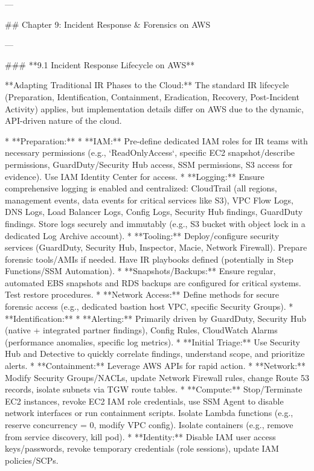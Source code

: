 \documentclass{article}
\begin{document}
---

## Chapter 9: Incident Response & Forensics on AWS

---

### **9.1 Incident Response Lifecycle on AWS**

**Adapting Traditional IR Phases to the Cloud:** The standard IR lifecycle (Preparation, Identification, Containment, Eradication, Recovery, Post-Incident Activity) applies, but implementation details differ on AWS due to the dynamic, API-driven nature of the cloud.

* **Preparation:**
    * **IAM:** Pre-define dedicated IAM roles for IR teams with necessary permissions (e.g., `ReadOnlyAccess`, specific EC2 snapshot/describe permissions, GuardDuty/Security Hub access, SSM permissions, S3 access for evidence). Use IAM Identity Center for access.
    * **Logging:** Ensure comprehensive logging is enabled and centralized: CloudTrail (all regions, management events, data events for critical services like S3), VPC Flow Logs, DNS Logs, Load Balancer Logs, Config Logs, Security Hub findings, GuardDuty findings. Store logs securely and immutably (e.g., S3 bucket with object lock in a dedicated Log Archive account).
    * **Tooling:** Deploy/configure security services (GuardDuty, Security Hub, Inspector, Macie, Network Firewall). Prepare forensic tools/AMIs if needed. Have IR playbooks defined (potentially in Step Functions/SSM Automation).
    * **Snapshots/Backups:** Ensure regular, automated EBS snapshots and RDS backups are configured for critical systems. Test restore procedures.
    * **Network Access:** Define methods for secure forensic access (e.g., dedicated bastion host VPC, specific Security Groups).
* **Identification:**
    * **Alerting:** Primarily driven by GuardDuty, Security Hub (native + integrated partner findings), Config Rules, CloudWatch Alarms (performance anomalies, specific log metrics).
    * **Initial Triage:** Use Security Hub and Detective to quickly correlate findings, understand scope, and prioritize alerts.
* **Containment:** Leverage AWS APIs for rapid action.
    * **Network:** Modify Security Groups/NACLs, update Network Firewall rules, change Route 53 records, isolate subnets via TGW route tables.
    * **Compute:** Stop/Terminate EC2 instances, revoke EC2 IAM role credentials, use SSM Agent to disable network interfaces or run containment scripts. Isolate Lambda functions (e.g., reserve concurrency = 0, modify VPC config). Isolate containers (e.g., remove from service discovery, kill pod).
    * **Identity:** Disable IAM user access keys/passwords, revoke temporary credentials (role sessions), update IAM policies/SCPs.
\end{document}
